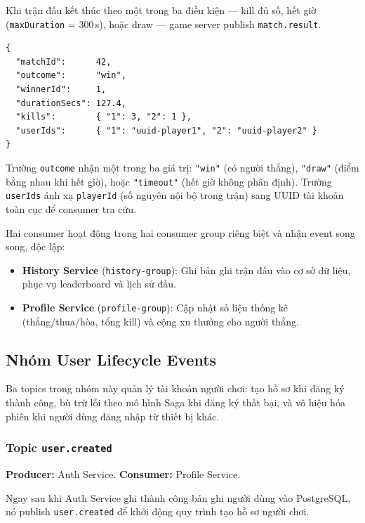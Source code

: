\documentclass[12pt,a4paper]{report}
\newcommand{\topic}[1]{\texttt{\textcolor{micropurple}{#1}}}
\begin{document}
Khi trận đấu kết thúc theo một trong ba điều kiện --- kill đủ số, hết giờ
(\texttt{maxDuration} = 300\,s), hoặc draw --- game server publish \topic{match.result}.

\begin{lstlisting}[style=jsonStyle,
  caption={Payload topic \texttt{match.result} (C++ Server -> History \& Profile)}]
{
  "matchId":      42,
  "outcome":      "win",
  "winnerId":     1,
  "durationSecs": 127.4,
  "kills":        { "1": 3, "2": 1 },
  "userIds":      { "1": "uuid-player1", "2": "uuid-player2" }
}
\end{lstlisting}

Trường \texttt{outcome} nhận một trong ba giá trị: \texttt{"win"} (có người thắng),
\texttt{"draw"} (điểm bằng nhau khi hết giờ), hoặc \texttt{"timeout"} (hết giờ không phân
định). Trường \texttt{userIds} ánh xạ \texttt{playerId} (số nguyên nội bộ trong trận) sang
UUID tài khoản toàn cục để consumer tra cứu.

Hai consumer hoạt động trong hai consumer group riêng biệt và nhận event song song, độc lập:
\begin{itemize}
  \item \textbf{History Service} (\texttt{history-group}): Ghi bản ghi trận đấu vào cơ sở
        dữ liệu, phục vụ leaderboard và lịch sử đấu.
  \item \textbf{Profile Service} (\texttt{profile-group}): Cập nhật số liệu thống kê
        (thắng/thua/hòa, tổng kill) và cộng xu thưởng cho người thắng.
\end{itemize}

\subsection{Nhóm User Lifecycle Events}

Ba topics trong nhóm này quản lý tài khoản người chơi: tạo hồ sơ khi đăng ký thành công,
bù trừ lỗi theo mô hình Saga khi đăng ký thất bại, và vô hiệu hóa phiên khi người dùng
đăng nhập từ thiết bị khác.

\subsubsection{Topic \texttt{user.created}}

\textbf{Producer:} Auth Service. \quad \textbf{Consumer:} Profile Service.

Ngay sau khi Auth Service ghi thành công bản ghi người dùng vào PostgreSQL, nó publish
\topic{user.created} để khởi động quy trình tạo hồ sơ người chơi.
\end{document}
